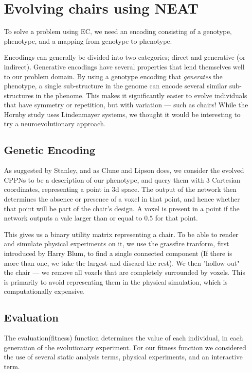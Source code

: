\section{Evolving chairs using NEAT}
To solve a problem using EC, we need an encoding consisting of a genotype,
phenotype, and a mapping from genotype to phenotype.

Encodings can generally be divided into two categories; direct and generative
(or indirect). Generative encodings have several properties that lend themselves
well to our problem domain. By using a genotype encoding that \emph{generates}
the phenotype, a single sub-structure in the genome can encode several similar
sub-structures in the phenome. This makes it significantly easier to evolve
individuals that have symmetry or repetition, but with variation --- such as
chairs! While the Hornby study\cite{paper:ev4} uses Lindenmayer
systems\cite{Hornby2003}, we thought it would be interesting to try a
neuroevolutionary approach.

\subsection{Genetic Encoding}
As suggested by Stanley\cite{Stanley2007}, and as Clune and
Lipson\cite{Clune:2011:EOG:2078245.2078246} does, we consider the evolved CPPNs
to be a description of our phenotype, and query them with 3 Cartesian
coordinates, representing a point in 3d space. The output of the network then
determines the absence or presence of a voxel in that point, and hence whether
that point will be part of the chair's design. A voxel is present in a point if
the network outputs a vale larger than or equal to $0.5$ for that point.

This gives us a binary utility matrix representing a chair. To be able to render
and simulate physical experiments on it, we use the grassfire tranform, first
introduced by Harry Blum\cite{blum67}, to find a single connected component (If
there is more than one, we take the largest and discard the rest). We then
"hollow out" the chair --- we remove all voxels that are completely surrounded by
voxels. This is primarily to avoid representing them in the physical simulation,
which is computationally expensive.

\subsection{Evaluation}
\label{sec:evaluation}
The evaluation(fitness) function determines the value of each individual, in
each generation of the evolutionary experiment. For our fitness function we
considered the use of several static analysis terms, physical experiments, and
an interactive term.


